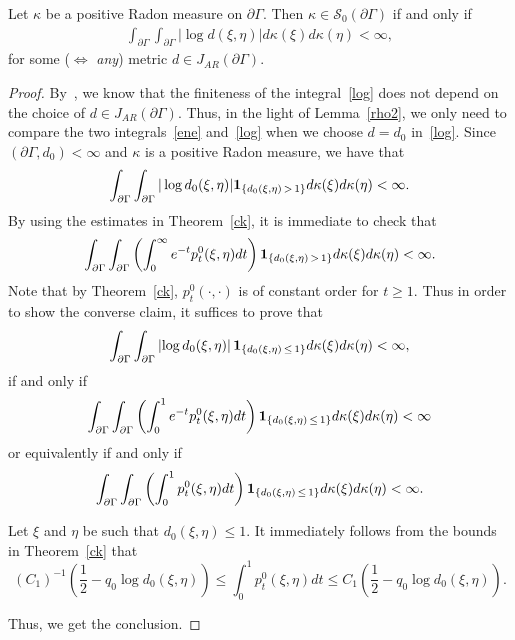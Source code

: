 \documentclass[AHL,Unicode,longabstracts,published]{cedram}
\newcommand{\cs}{\mathcal{S}}
\begin{document}
\begin{prop}\label{criterion}
Let $\kappa$ be a positive Radon measure on $\partial\Gamma$. Then $\kappa\in\cs_0(\partial\Gamma)$ if and only if
\begin{align}\label{log}
\int_{\partial\Gamma}\int_{\partial\Gamma}|\log d(\xi,\eta)|d\kappa(\xi)d\kappa(\eta)<\infty,
\end{align}
for some ($\Leftrightarrow$ \emph{any}) metric $d\in J_{AR}(\partial\Gamma)$.
\end{prop}

\begin{proof}
By~\cite[Corollary~11.5]{Hei}, we know that the finiteness of the integral~\eqref{log} does not depend on the choice of
$d\in J_{AR}(\partial\Gamma)$. Thus, in the light of Lemma~\ref{rho2}, we only need to compare the two integrals~\eqref{ene} and~\eqref{log} when we choose $d=d_0$ in~\eqref{log}. Since $(\partial\Gamma,d_0)<\infty$ and $\kappa$ is a positive Radon measure, we have that
\begin{align*}
\int_{\partial\Gamma}\int_{\partial\Gamma}|\log d_0(\xi,\eta)| {\bf 1}_{\left\{d_0(\xi,\eta)\,>\,1\right\}}d\kappa(\xi)d\kappa(\eta)<\infty.
\end{align*}
By using the estimates in Theorem~\ref{ck}, it is immediate to check that
\begin{align*}
\int_{\partial\Gamma}\int_{\partial\Gamma}\left(\int_0^{\infty}e^{-t}p_t^0(\xi,\eta)dt\right){\bf 1}_{\left\{d_0(\xi,\eta)\,>\,1\right\}} d\kappa(\xi)d\kappa(\eta)<\infty.
\end{align*}
Note that by Theorem~\ref{ck}, $p_t^0(\cdot,\cdot)$ is of constant order for $t\geq1$. Thus in order to show the converse claim, it suffices to prove that
\begin{align*}
\int_{\partial\Gamma}\int_{\partial\Gamma}\left|\log d_0(\xi,\eta)\right| {\bf 1}_{\left\{d_0(\xi,\eta)\,\leq\,1\right\}}d\kappa(\xi)d\kappa(\eta)<\infty,
\end{align*}
if and only if
\begin{align*}
\int_{\partial\Gamma}\int_{\partial\Gamma}\left(\int_0^{1}e^{-t}p_t^0(\xi,\eta)dt\right) {\bf 1}_{\left\{d_0(\xi,\eta)\,\leq\,1\right\}}d\kappa(\xi)d\kappa(\eta)<\infty
\end{align*}
or equivalently if and only if
\begin{align*}
\int_{\partial\Gamma}\int_{\partial\Gamma}\left(\int_0^{1}p_t^0(\xi,\eta)dt\right) {\bf 1}_{\left\{d_0(\xi,\eta)\,\leq\,1\right\}}d\kappa(\xi)d\kappa(\eta)<\infty.
\end{align*}

Let $\xi$ and $\eta$ be such that $d_0(\xi,\eta)\leq1$. It immediately follows from the bounds in Theorem~\ref{ck} that
\[
(C_1)^{-1}\left(\frac 12 -q_0\log d_0(\xi,\eta)\right)
\leq \int_0^1 p_t^0(\xi,\eta)dt \leq C_1\left(\frac 12 -q_0\log d_0(\xi,\eta)\right).
\]


Thus, we get the conclusion.
\end{proof}
\end{document}
